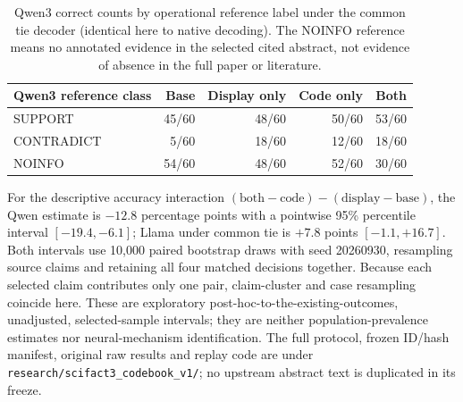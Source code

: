 \begin{table}[!h]
\centering
\small
\begin{tabular}{lrrrr}
\toprule
Qwen3 reference class & Base & Display only & Code only & Both \\
\midrule
SUPPORT & 45/60 & 48/60 & 50/60 & 53/60 \\
CONTRADICT & 5/60 & 18/60 & 12/60 & 18/60 \\
NOINFO & 54/60 & 48/60 & 52/60 & 30/60 \\
\bottomrule
\end{tabular}
\caption{Qwen3 correct counts by operational reference label under the
common tie decoder (identical here to native decoding). The NOINFO reference
means no annotated evidence in the selected cited abstract, not evidence
of absence in the full paper or literature.}
\label{tab:scifact3-codebook-class}
\end{table}

For the descriptive accuracy interaction
$(\mathrm{both}-\mathrm{code})-(\mathrm{display}-\mathrm{base})$,
the Qwen estimate is $-12.8$ percentage points with a pointwise 95\%
percentile interval $[-19.4,-6.1]$; Llama under common tie is $+7.8$
points $[-1.1,+16.7]$. Both intervals use 10,000 paired bootstrap draws
with seed 20260930, resampling source claims and retaining all four matched
decisions together. Because each selected claim contributes only one pair,
claim-cluster and case resampling coincide here. These are exploratory
post-hoc-to-the-existing-outcomes, unadjusted, selected-sample intervals;
they are neither population-prevalence estimates nor neural-mechanism
identification. The full protocol, frozen ID/hash manifest, original raw
results and replay code are under
\texttt{research/scifact3\_codebook\_v1/}; no upstream abstract text is
duplicated in its freeze.
